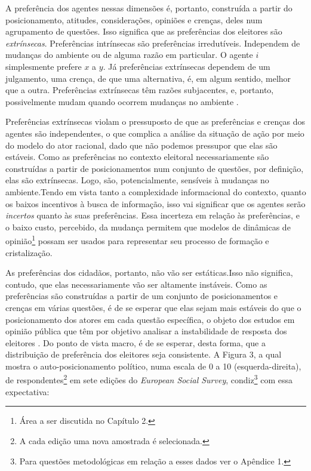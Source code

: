 A preferência dos agentes nessas dimensões é, portanto, construída a partir do
posicionamento, atitudes, considerações, opiniões e crenças, deles num
agrupamento de questões. Isso significa que as preferências dos eleitores são
\textit{extrínsecas}. Preferências intrínsecas são preferências irredutíveis.
Independem de mudanças do ambiente ou de alguma razão em particular. O agente
\(i\) simplesmente prefere \(x\) a \(y\). Já preferências extrínsecas dependem
de um julgamento, uma crença, de que uma alternativa, é, em algum sentido, melhor
que a outra. Preferências extrínsecas têm razões subjacentes, e, portanto,
possivelmente mudam quando ocorrem mudanças no ambiente \cite{liu2010wright,
  binmore2008rational}.

Preferências extrínsecas violam o pressuposto de que as preferências e crenças
dos agentes são independentes, o que complica a análise da situação de ação por
meio do modelo do ator racional, dado que não podemos pressupor que elas são
estáveis. Como as preferências no contexto eleitoral necessariamente são
construídas a partir de posicionamentos num conjunto de questões, por definição,
elas são extrínsecas. Logo, são, potencialmente, sensíveis à mudanças no
ambiente.Tendo em vista tanto a complexidade informacional do contexto, quanto
os baixos incentivos à busca de informação, isso vai significar que os agentes
serão \textit{incertos} quanto às suas preferências. Essa incerteza em relação
às preferências, e o baixo custo, percebido, da mudança permitem que modelos de
dinâmicas de opinião\footnote{Área a ser discutida no Capítulo 2.} possam ser
usados para representar seu processo de formação e cristalização.


As preferências dos cidadãos, portanto, não vão ser estáticas.Isso não
significa, contudo, que elas necessariamente vão ser altamente instáveis. Como
as preferências são construídas a partir de um conjunto de posicionamentos e
crenças em várias questões, é de se esperar que elas sejam mais estáveis do que
o posicionamento dos atores em cada questão específica, o objeto dos estudos em
opinião pública que têm por objetivo analisar a instabilidade de resposta dos
eleitores \cite{druckman2012public}. Do ponto de vista macro, é de se esperar,
desta forma, que a distribuição de preferência dos eleitores seja consistente. A
Figura 3, a qual mostra o auto-posicionamento político, numa escala de 0 a 10
(esquerda-direita), de respondentes\footnote{A cada edição uma nova amostrada é
  selecionada.} em sete edições do \textit{European Social Survey},
condiz\footnote{Para questões metodológicas em relação a esses dados ver o
  Apêndice 1.} com essa expectativa:


